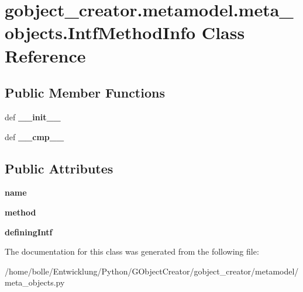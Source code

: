 \hypertarget{classgobject__creator_1_1metamodel_1_1meta__objects_1_1IntfMethodInfo}{
\section{gobject\_\-creator.metamodel.meta\_\-objects.IntfMethodInfo Class Reference}
\label{classgobject__creator_1_1metamodel_1_1meta__objects_1_1IntfMethodInfo}
}
\subsection*{Public Member Functions}
\begin{DoxyCompactItemize}
\item 
\hypertarget{classgobject__creator_1_1metamodel_1_1meta__objects_1_1IntfMethodInfo_a012f9e583e7c99241e796d077b68cefa}{
def {\bfseries \_\-\_\-init\_\-\_\-}}
\label{classgobject__creator_1_1metamodel_1_1meta__objects_1_1IntfMethodInfo_a012f9e583e7c99241e796d077b68cefa}

\item 
\hypertarget{classgobject__creator_1_1metamodel_1_1meta__objects_1_1IntfMethodInfo_a3698aa7d2ced342290c7837b24af6eeb}{
def {\bfseries \_\-\_\-cmp\_\-\_\-}}
\label{classgobject__creator_1_1metamodel_1_1meta__objects_1_1IntfMethodInfo_a3698aa7d2ced342290c7837b24af6eeb}

\end{DoxyCompactItemize}
\subsection*{Public Attributes}
\begin{DoxyCompactItemize}
\item 
\hypertarget{classgobject__creator_1_1metamodel_1_1meta__objects_1_1IntfMethodInfo_a31b6c4df7e5bcbaaa8c9fef656a1396b}{
{\bfseries name}}
\label{classgobject__creator_1_1metamodel_1_1meta__objects_1_1IntfMethodInfo_a31b6c4df7e5bcbaaa8c9fef656a1396b}

\item 
\hypertarget{classgobject__creator_1_1metamodel_1_1meta__objects_1_1IntfMethodInfo_a82b225ba4b38ef017cb87879bc1868d4}{
{\bfseries method}}
\label{classgobject__creator_1_1metamodel_1_1meta__objects_1_1IntfMethodInfo_a82b225ba4b38ef017cb87879bc1868d4}

\item 
\hypertarget{classgobject__creator_1_1metamodel_1_1meta__objects_1_1IntfMethodInfo_a185111a82931ce3bd31b02f8df82cb62}{
{\bfseries definingIntf}}
\label{classgobject__creator_1_1metamodel_1_1meta__objects_1_1IntfMethodInfo_a185111a82931ce3bd31b02f8df82cb62}

\end{DoxyCompactItemize}


The documentation for this class was generated from the following file:\begin{DoxyCompactItemize}
\item 
/home/bolle/Entwicklung/Python/GObjectCreator/gobject\_\-creator/metamodel/meta\_\-objects.py\end{DoxyCompactItemize}
